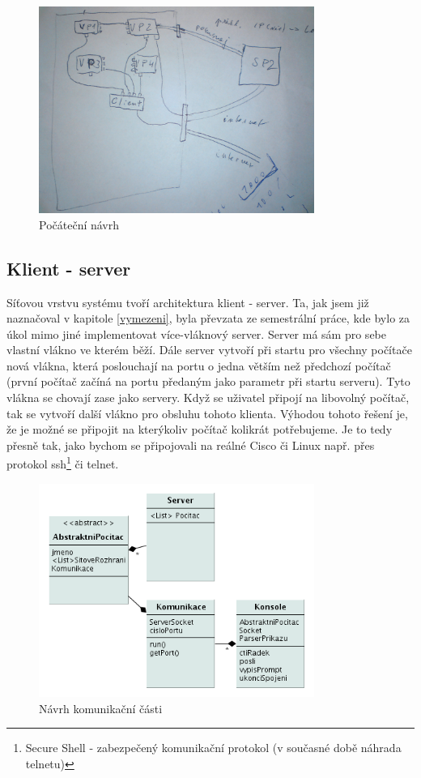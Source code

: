 \begin{figure}[h]
\begin{center}
\includegraphics[width=9cm]{figures/navrh}
\caption{Počáteční návrh}
\label{fig:navrh}
\end{center}
\end{figure}

\subsection{Klient - server}\label{klien_server}
Síťovou vrstvu systému tvoří architektura klient - server. Ta, jak jsem již naznačoval v kapitole \ref{vymezeni}, byla převzata ze semestrální práce, kde bylo za úkol mimo jiné implementovat více-vláknový server. Server má sám pro sebe vlastní vlákno ve kterém běží. Dále server vytvoří při startu pro všechny počítače nová vlákna, která poslouchají na portu o jedna větším než předchozí počítač (první počítač začíná na portu předaným jako parametr při startu serveru). Tyto vlákna se chovají zase jako servery. Když se uživatel připojí na libovolný počítač, tak se vytvoří další vlákno pro obsluhu tohoto klienta. Výhodou tohoto řešení je, že je možné se připojit na kterýkoliv počítač kolikrát potřebujeme. Je to tedy přesně tak, jako bychom se připojovali na reálné Cisco či Linux např. přes protokol ssh\footnote{Secure Shell - zabezpečený komunikační protokol (v současné době náhrada telnetu)} či telnet.

\begin{figure}[h]
\begin{center}
\includegraphics[width=9cm]{figures/uml_sit2}
\caption{Návrh komunikační části}
\label{fig:sit}
\end{center}
\end{figure}

